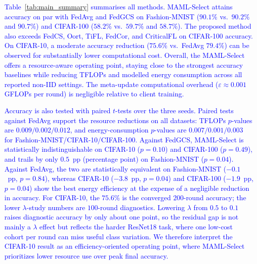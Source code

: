 \documentclass[journal]{IEEEtran}
\newcommand{\revision}[1]{\textcolor{blue}{#1}}
\begin{document}
\revision{Table~\ref{tab:main_summary} summarises all methods. MAML-Select attains accuracy on par with FedAvg and FedGCS on Fashion-MNIST ($90.1\%$ vs.\ $90.2\%$ and $90.7\%$) and CIFAR-100 ($58.2\%$ vs.\ $59.7\%$ and $58.7\%$). The proposed method also exceeds FedCS, Oort, TiFL, FedCor, and CriticalFL on CIFAR-100 accuracy. On CIFAR-10, a moderate accuracy reduction ($75.6\%$ vs.\ FedAvg $79.4\%$) can be observed for substantially lower computational cost. Overall, the MAML-Select offers a resource-aware operating point, staying close to the strongest accuracy baselines while reducing TFLOPs and modelled energy consumption across all reported non-IID settings. The meta-update computational overhead ($\varepsilon \approx 0.001$ GFLOPs per round) is negligible relative to client training. }

\revision{Accuracy is also tested with paired $t$-tests over the three seeds. Paired tests against FedAvg support the resource reductions on all datasets: TFLOPs $p$-values are $0.009/0.002/0.012$, and energy-consumption $p$-values are $0.007/0.001/0.003$ for Fashion-MNIST/CIFAR-10/CIFAR-100. Against FedGCS, MAML-Select is statistically indistinguishable on CIFAR-10 ($p=0.10$) and CIFAR-100 ($p=0.49$), and trails by only $0.5$~pp (percentage point) on Fashion-MNIST ($p=0.04$). Against FedAvg, the two are statistically equivalent on Fashion-MNIST ($-0.1$~pp, $p=0.84$), whereas CIFAR-10 ($-3.8$~pp, $p=0.04$) and CIFAR-100 ($-1.9$~pp, $p=0.04$) show the best energy efficiency at the expense of a negligible reduction in accuracy. For CIFAR-10, the $75.6\%$ is the converged $200$-round accuracy; the lower $\lambda$-study numbers are $100$-round diagnostics. Lowering $\lambda$ from $0.5$ to $0.1$ raises diagnostic accuracy by only about one point, so the residual gap is not mainly a $\lambda$ effect but reflects the harder ResNet18 task, where one low-cost cohort per round can miss useful class variation. We therefore interpret the CIFAR-10 result as an efficiency-oriented operating point, where MAML-Select prioritizes lower resource use over peak final accuracy.}
\end{document}
